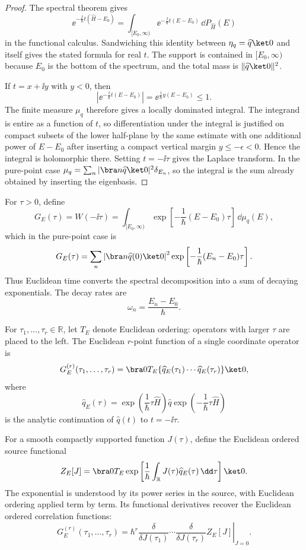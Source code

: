 \begin{proof}
The spectral theorem gives
\[
  \ee^{-\frac{\ii}{\hbar}t(\widehat H-E_0)}
  =
  \int_{[E_0,\infty)}
  \ee^{-\frac{\ii}{\hbar}t(E-E_0)}\,\dd P_{\widehat H}(E)
\]
in the functional calculus.  Sandwiching this identity between
\(\eta_q=\widehat q\ket0\) and itself gives the stated formula for real
\(t\).  The support is contained in \([E_0,\infty)\) because \(E_0\) is the
bottom of the spectrum, and the total mass is
\(\|\widehat q\ket0\|^2\).

If \(t=x+\ii y\) with \(y<0\), then
\[
  \left|
  \ee^{-\frac{\ii}{\hbar}t(E-E_0)}
  \right|
  =
  \ee^{\frac{1}{\hbar}y(E-E_0)}
  \le 1 .
\]
The finite measure \(\mu_q\) therefore gives a locally dominated integral.
The integrand is entire as a function of \(t\), so differentiation under the
integral is justified on compact subsets of the lower half-plane by the same
estimate with one additional power of \(E-E_0\) after inserting a compact
vertical margin \(y\le -\epsilon<0\).  Hence the integral is holomorphic
there.  Setting \(t=-\ii\tau\) gives the Laplace transform.  In the
pure-point case \(\mu_q=\sum_n |\bra n\widehat q\ket0|^2\delta_{E_n}\), so
the integral is the sum already obtained by inserting the eigenbasis.
\end{proof}
For \(\tau>0\), define
\[
  G_E(\tau)
  =
  W(-\ii\tau)
  =
  \int_{[E_0,\infty)}
  \exp\left[-\frac{1}{\hbar}(E-E_0)\tau\right]\,\dd\mu_q(E),
\]
which in the pure-point case is
\[
  G_E(\tau)
  =
  \sum_n
  \left|\bra n\widehat q(0)\ket 0\right|^2
  \exp\left[-\frac{1}{\hbar}(E_n-E_0)\tau\right].
\]
Thus Euclidean time converts the spectral decomposition into a sum of
decaying exponentials. The decay rates are
\[
  \omega_n=\frac{E_n-E_0}{\hbar}.
\]

For \(\tau_1,\ldots,\tau_r\in\mathbb R\), let \(T_E\) denote Euclidean
ordering: operators with larger \(\tau\) are placed to the left. The Euclidean
\(r\)-point function of a single coordinate operator is
\[
  G_E^{(r)}(\tau_1,\ldots,\tau_r)
  =
  \bra 0
  T_E\{\widehat q_E(\tau_1)\cdots\widehat q_E(\tau_r)\}
  \ket 0,
\]
where
\[
  \widehat q_E(\tau)
  =
  \exp\left(\frac{1}{\hbar}\tau\widehat H\right)
  \widehat q
  \exp\left(-\frac{1}{\hbar}\tau\widehat H\right)
\]
is the analytic continuation of \(\widehat q(t)\) to \(t=-\ii\tau\).

\begin{definition}
\label{def:euclidean-ordered-source-functional-qm}
For a smooth compactly supported function \(J(\tau)\), define the
Euclidean ordered source functional
\[
  Z_E[J]
  =
  \bra 0
  T_E
  \exp\left[
    \frac{1}{\hbar}
    \int_{\mathbb R}J(\tau)\widehat q_E(\tau)\,\dd\tau
  \right]
  \ket 0 .
\]
The exponential is understood by its power series in the source, with
Euclidean ordering applied term by term.  Its functional derivatives recover
the Euclidean ordered correlation functions:
\[
  G_E^{(r)}(\tau_1,\ldots,\tau_r)
  =
  \left.
  \hbar^r
  \frac{\delta}{\delta J(\tau_1)}
  \cdots
  \frac{\delta}{\delta J(\tau_r)}
  Z_E[J]
  \right|_{J=0}.
\]
\end{definition}

